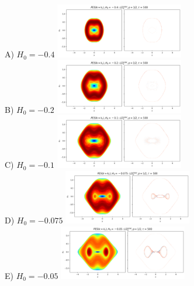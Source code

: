 \documentclass[10pt,aps,onecolumn,superscriptaddress]{revtex4-2}
\begin{document}
%
%
\begin{figure}
    \centering
    A) $H_0 = -0.4$ \includegraphics[width=0.5\textwidth]{notebooks/bifurcation/k_critical/LD_total_x-px_tau_500_k_kc_E_-0.4.png}\\
    B) $H_0 = -0.2$ \includegraphics[width=0.5\textwidth]{notebooks/bifurcation/k_critical/LD_total_x-px_tau_500_k_kc_E_-0.2.png}\\
    C) $H_0 = -0.1$ \includegraphics[width=0.5\textwidth]{notebooks/bifurcation/k_critical/LD_total_x-px_tau_500_k_kc_E_-0.1.png}\\
    D) $H_0 = -0.075$ \includegraphics[width=0.5\textwidth]{notebooks/bifurcation/k_critical/LD_total_x-px_tau_500_k_kc_E_-0.075.png}\\
    E) $H_0 = -0.05$ \includegraphics[width=0.5\textwidth]{notebooks/bifurcation/k_critical/LD_total_x-px_tau_500_k_kc_E_-0.05.png}\\

\end{figure}
\end{document}

